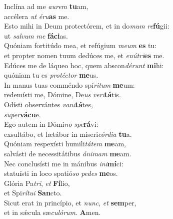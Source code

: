 \evenverse Inclína ad me \textit{au}\textit{rem} \textbf{tu}am,~\*\\
\evenverse accélera \textit{ut} \textit{é}\textit{ru}\textbf{as} me.\\
\oddverse Esto mihi in Deum protectórem, et in do\textit{mum} \textit{re}\textbf{fú}gii:~\*\\
\oddverse ut \textit{sal}\textit{vum} \textit{me} \textbf{fá}\textbf{ci}as.\\
\evenverse Quóniam fortitúdo mea, et refúgium \textit{me}\textit{um} \textbf{es} tu:~\*\\
\evenverse et propter nomen tuum dedúces me, et \textit{e}\textit{nú}\textit{tri}\textbf{es} me.\\
\oddverse Edúces me de láqueo hoc, quem abscon\textit{dé}\textit{runt} \textbf{mi}hi:~\*\\
\oddverse quóniam tu es \textit{pro}\textit{té}\textit{ctor} \textbf{me}us.\\
\evenverse In manus tuas comméndo spí\textit{ri}\textit{tum} \textbf{me}um:~\*\\
\evenverse redemísti me, Dómine, De\textit{us} \textit{ve}\textit{ri}\textbf{tá}tis.\\
\oddverse Odísti observántes \textit{va}\textit{ni}\textbf{tá}tes,~\*\\
\oddverse \textit{su}\textit{per}\textbf{vá}\textbf{cu}e.\\
\evenverse Ego autem in Dómi\textit{no} \textit{spe}\textbf{rá}vi:~\*\\
\evenverse exsultábo, et lætábor in miseri\textit{cór}\textit{di}\textit{a} \textbf{tu}a.\\
\oddverse Quóniam respexísti humili\textit{tá}\textit{tem} \textbf{me}am,~\*\\
\oddverse salvásti de necessitátibus \textit{á}\textit{ni}\textit{mam} \textbf{me}am.\\
\evenverse Nec conclusísti me in mánibus \textit{i}\textit{ni}\textbf{mí}ci:~\*\\
\evenverse statuísti in loco spatió\textit{so} \textit{pe}\textit{des} \textbf{me}os.\\
\oddverse Glória Pa\textit{tri}, \textit{et} \textbf{Fí}lio,~\*\\
\oddverse et Spi\textit{rí}\textit{tu}\textit{i} \textbf{San}cto.\\
\evenverse Sicut erat in princípio, et \textit{nunc}, \textit{et} \textbf{sem}per,~\*\\
\evenverse et in sǽcula sæ\textit{cu}\textit{ló}\textit{rum}. \textbf{A}men.\\
